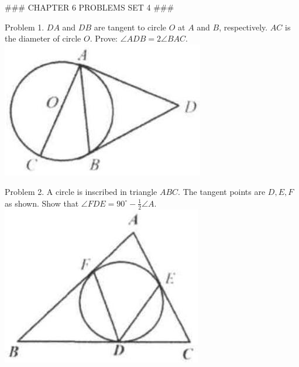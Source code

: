 \documentclass[10pt]{article}
\begin{document}
### CHAPTER 6 PROBLEMS SET 4 ###

Problem 1. \(D A\) and \(D B\) are tangent to circle \(O\) at \(A\) and \(B\), respectively. \(A C\) is the diameter of circle \(O\). Prove: \(\angle A D B=2 \angle B A C\).\\
\includegraphics[max width=\textwidth, center]{2025_04_17_97bc1f7e44d93c271a88g-206(2)}

Problem 2. A circle is inscribed in triangle \(A B C\). The tangent points are \(D, E, F\) as shown. Show that \(\angle F D E=90^{\circ}-\frac{1}{2} \angle A\).\\
\includegraphics[max width=\textwidth, center]{2025_04_17_97bc1f7e44d93c271a88g-206(3)}
\end{document}
